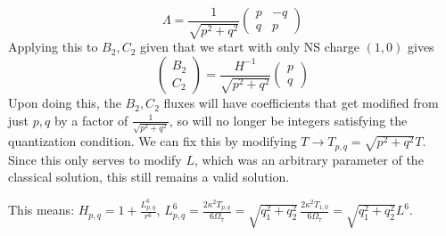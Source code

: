 \documentclass[11pt, class=article, crop=false]{standalone}
\begin{document}
\begin{enumerate}
	\[
		\Lambda = \frac{1}{\sqrt{p^2 + q^2}} \begin{pmatrix}
			p & -q\\
			q & p
		\end{pmatrix}
	\]
	Applying this to $B_2, C_2$ given that we start with only NS charge $(1,0)$ gives
	\[
		\begin{pmatrix}
					B_2\\ C_2
				\end{pmatrix} = \frac{H^{-1}}{\sqrt{p^2 + q^2}} \begin{pmatrix}
					p\\q
				\end{pmatrix}
	\]
	Upon doing this, the $B_2, C_2$ fluxes will have coefficients that get modified from just $p, q$ by a factor of $\frac{1}{\sqrt{p^2 + q^2}}$, so will no longer be integers satisfying the quantization condition. We can fix this by modifying $T \to T_{p,q} = \sqrt{p^2 + q^2} T$. Since this only serves to modify $L$, which was an arbitrary parameter of the classical solution, this still remains a valid solution.
	
	This means: $H_{p,q} = 1 + \frac{L^6_{p,q}}{r^6}$, $L_{p,q}^6 = \frac{2 \kappa^2 T_{p,q}}{6 \Omega_7} = \sqrt{q_1^2 + q_2^2}\,  \frac{2 \kappa^2 T_{1,0}}{6 \Omega_7} = \sqrt{q_1^2 + q_2^2} L^6$.
	

\end{enumerate}
\end{document}
